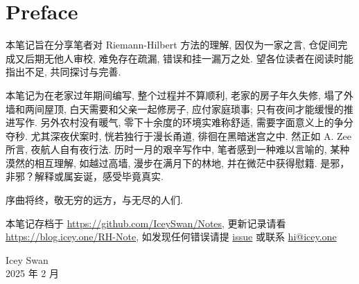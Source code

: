 \chapter{Preface}
本笔记旨在分享笔者对 Riemann-Hilbert 方法的理解, 因仅为一家之言, 仓促间完成又后期无他人审校, 难免存在疏漏, 错误和挂一漏万之处. 望各位读者在阅读时能指出不足, 共同探讨与完善. 


本笔记为在老家过年期间编写, 整个过程并不算顺利\cite{Fan-RH}, 老家的房子年久失修, 塌了外墙和两间屋顶, 白天需要和父亲一起修房子, 应付家庭琐事; 只有夜间才能缓慢的推进写作. 另外农村没有暖气, 零下十余度的环境实难称舒适, 需要字面意义上的争分夺秒. 尤其深夜伏案时, 恍若独行于漫长甬道, 徘徊在黑暗迷宫之中. 然正如 A. Zee 所言, 夜航人自有夜行法\cite{NightPhysics}. 历时一月的艰辛写作中, 笔者感到一种难以言喻的, 某种漠然的相互理解, 如越过高墙, 漫步在满月下的林地, 并在微茫中获得慰籍. 是邪，非邪？解释或属妄诞，感受毕竟真实. 

序曲将终，敬无穷的远方，与无尽的人们.  

本笔记存档于 \href{https://github.com/IceySwan/Notes}{https://github.com/IceySwan/Notes}, 更新记录请看 \href{https://blog.icey.one/RH-Note}{https://blog.icey.one/RH-Note}, 如发现任何错误请提 \href{https://github.com/IceySwan/Notes/issues/new}{issue} 或联系 \href{mailto:hi@icey.one}{hi@icey.one}

\begin{flushright}
    Icey Swan\\
    2025 年 2 月%
\end{flushright}
%

